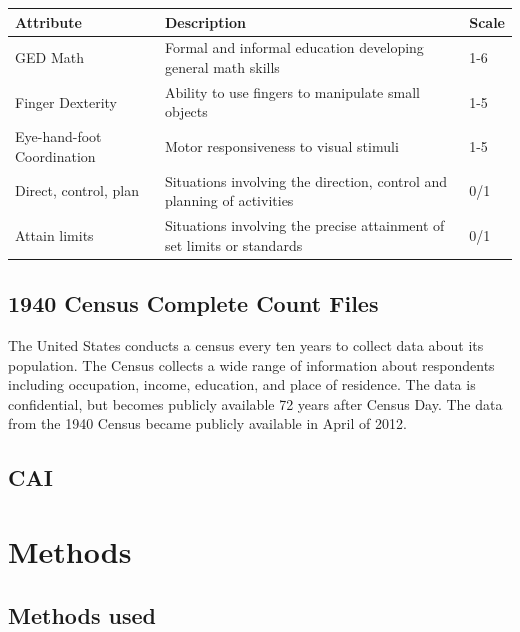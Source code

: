 \documentclass[11pt]{article}
\begin{document}
    \begin{table}[h!]
      \centering
      \begin{tabular}{|l|l|l|}
      \hline
      \textbf{Attribute}         & \textbf{Description}                                                   & \textbf{Scale} \\ \hline
      GED Math                   & Formal and informal education developing general math skills           & 1-6            \\ \hline
      Finger Dexterity           & Ability to use fingers to manipulate small objects                     & 1-5            \\ \hline
      Eye-hand-foot Coordination & Motor responsiveness to visual stimuli                                 & 1-5            \\ \hline
      Direct, control, plan      & Situations involving the direction, control and planning of activities & 0/1            \\ \hline
      Attain limits              & Situations involving the precise attainment of set limits or standards & 0/1            \\ \hline
      \end{tabular}
    \end{table}


  \subsection{1940 Census Complete Count Files}
  The United States conducts a census every ten years to collect data about its population. The Census collects a wide range of information about respondents including occupation, income, education, and place of residence. The data is confidential, but becomes publicly available 72 years after Census Day. The data from the 1940 Census became publicly available in April of 2012.

  \subsection{CAI}

\section{Methods}
  \subsection{Methods used}
\end{document}
